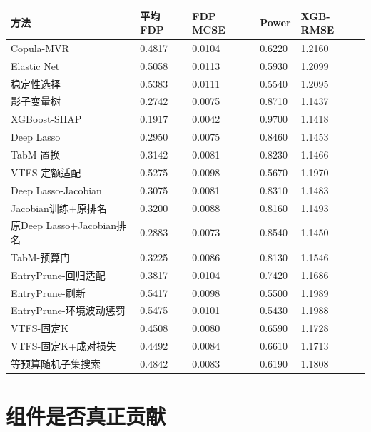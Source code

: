 \documentclass[UTF8,11pt,a4paper]{ctexart}
\begin{document}
{\def\LTcaptype{none} %
{
\footnotesize
\begin{longtable}[]{@{}lllll@{}}
\toprule\noalign{}
方法 & 平均FDP & FDP MCSE & Power & XGB-RMSE \\
\midrule\noalign{}
\endhead
\bottomrule\noalign{}
\endlastfoot
Copula-MVR & 0.4817 & 0.0104 & 0.6220 & 1.2160 \\
Elastic Net & 0.5058 & 0.0113 & 0.5930 & 1.2099 \\
稳定性选择 & 0.5383 & 0.0111 & 0.5540 & 1.2095 \\
影子变量树 & 0.2742 & 0.0075 & 0.8710 & 1.1437 \\
XGBoost-SHAP & 0.1917 & 0.0042 & 0.9700 & 1.1418 \\
Deep Lasso & 0.2950 & 0.0075 & 0.8460 & 1.1453 \\
TabM-置换 & 0.3142 & 0.0081 & 0.8230 & 1.1466 \\
VTFS-定额适配 & 0.5275 & 0.0098 & 0.5670 & 1.1970 \\
Deep Lasso-Jacobian & 0.3075 & 0.0081 & 0.8310 & 1.1483 \\
Jacobian训练+原排名 & 0.3200 & 0.0088 & 0.8160 & 1.1493 \\
原Deep Lasso+Jacobian排名 & 0.2883 & 0.0073 & 0.8540 & 1.1450 \\
TabM-预算门 & 0.3225 & 0.0086 & 0.8130 & 1.1546 \\
EntryPrune-回归适配 & 0.3817 & 0.0104 & 0.7420 & 1.1686 \\
EntryPrune-刷新 & 0.5417 & 0.0098 & 0.5500 & 1.1989 \\
EntryPrune-环境波动惩罚 & 0.5475 & 0.0101 & 0.5430 & 1.1988 \\
VTFS-固定K & 0.4508 & 0.0080 & 0.6590 & 1.1728 \\
VTFS-固定K+成对损失 & 0.4492 & 0.0084 & 0.6610 & 1.1713 \\
等预算随机子集搜索 & 0.4842 & 0.0083 & 0.6190 & 1.1808 \\
\end{longtable}
}
}

\section{组件是否真正贡献}\label{ux7ec4ux4ef6ux662fux5426ux771fux6b63ux8d21ux732e}
\end{document}
